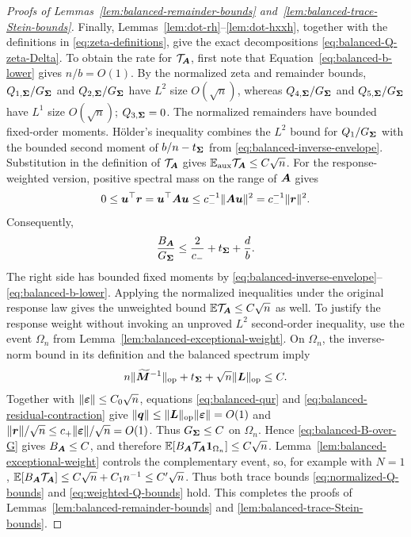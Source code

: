 \documentclass{article}
\theoremstyle{plain} %
\theoremstyle{definition} %
\theoremstyle{definition} %
\begin{document}
\begin{proof}[Proofs of Lemmas~\ref{lem:balanced-remainder-bounds}
and~\ref{lem:balanced-trace-Stein-bounds}]
Finally, Lemmas~\ref{lem:dot-rh}--\ref{lem:dot-hxxh}, together with
the definitions in \eqref{eq:zeta-definitions}, give
the exact decompositions \eqref{eq:balanced-Q-zeta-Delta}.
To obtain the rate for $\mathcal T_{\boldsymbol{A}}$, first note that
Equation~\eqref{eq:balanced-b-lower} gives $n/b=O(1)$.
By the normalized zeta and remainder bounds,
$Q_{1,\boldsymbol{\Sigma}}/G_{\boldsymbol{\Sigma}}$ and
$Q_{2,\boldsymbol{\Sigma}}/G_{\boldsymbol{\Sigma}}$ have $L^2$ size $O(\sqrt n)$,
whereas $Q_{4,\boldsymbol{\Sigma}}/G_{\boldsymbol{\Sigma}}$ and
$Q_{5,\boldsymbol{\Sigma}}/G_{\boldsymbol{\Sigma}}$ have $L^1$ size $O(\sqrt n)$;
$Q_{3,\boldsymbol{\Sigma}}=0$.  The normalized remainders have bounded
fixed-order moments. H\"older's inequality combines the $L^2$
bound for $Q_1/G_{\boldsymbol{\Sigma}}$ with the bounded second moment of
$b/n-t_{\boldsymbol{\Sigma}}$ from \eqref{eq:balanced-inverse-envelope}.
Substitution in the definition of $\mathcal T_{\boldsymbol{A}}$ gives
${\mathbb{E}}_{\rm aux}\mathcal T_{\boldsymbol{A}}\leq C\sqrt n$.
For the response-weighted version, positive spectral mass on the range of
$\boldsymbol{A}$ gives
\begin{align*}
    0\leq\boldsymbol{u}^\top\boldsymbol{r}=\boldsymbol{u}^\top\boldsymbol{A}\boldsymbol{u}
    \leq c_-^{-1}\lVert\boldsymbol{A}\boldsymbol{u}\rVert^2
    =c_-^{-1}\lVert\boldsymbol{r}\rVert^2.
\end{align*}
Consequently,
\begin{align}
    \frac{B_{\boldsymbol{A}}}{G_{\boldsymbol{\Sigma}}}
    \leq \frac{2}{c_-}+t_{\boldsymbol{\Sigma}}+\frac{d}{b}.
    \label{eq:balanced-B-over-G}
\end{align}
The right side has bounded fixed moments by
\eqref{eq:balanced-inverse-envelope}--\eqref{eq:balanced-b-lower}.  Applying
the normalized inequalities under the original response law gives the
unweighted bound ${\mathbb{E}}\mathcal T_{\boldsymbol{A}}\leq C\sqrt n$ as well.  To justify the
response weight without invoking an unproved $L^2$ second-order inequality,
use the event $\Omega_n$ from
Lemma~\ref{lem:balanced-exceptional-weight}.  On $\Omega_n$, the inverse-norm bound in its definition and the
balanced spectrum imply
\begin{align*}
    n\lVert\widetilde{\boldsymbol{M}}^{-1}\rVert_{\rm op}
       +t_{\boldsymbol{\Sigma}}+\sqrt n\lVert\boldsymbol{L}\rVert_{\rm op}\leq C.
\end{align*}
Together with $\lVert{\boldsymbol{\varepsilon} }\rVert\leq C_0\sqrt n$, equations
\eqref{eq:balanced-qur} and \eqref{eq:balanced-residual-contraction} give
$\lVert\boldsymbol{q}\rVert\leq\lVert\boldsymbol{L}\rVert_{\rm op}\lVert{\boldsymbol{\varepsilon} }\rVert=O(1)$ and
$\lVert\boldsymbol{r}\rVert/\sqrt n\leq c_+\lVert{\boldsymbol{\varepsilon} }\rVert/\sqrt n=O(1)$.
Thus $G_{\boldsymbol{\Sigma}}\leq C$ on $\Omega_n$.
Hence \eqref{eq:balanced-B-over-G} gives
$B_{\boldsymbol{A}}\leq C$, and therefore
${\mathbb{E}}[B_{\boldsymbol{A}}\mathcal T_{\boldsymbol{A}}\boldsymbol{1}_{\Omega_n}]\leq C\sqrt n$.
Lemma~\ref{lem:balanced-exceptional-weight} controls the complementary event,
so, for example with $N=1$,
${\mathbb{E}}[B_{\boldsymbol{A}}\mathcal T_{\boldsymbol{A}}]
\leq C\sqrt n+C_1n^{-1}\leq C'\sqrt n$.
Thus both trace bounds \eqref{eq:normalized-Q-bounds} and
\eqref{eq:weighted-Q-bounds} hold.
This completes the proofs of Lemmas~\ref{lem:balanced-remainder-bounds} and
\ref{lem:balanced-trace-Stein-bounds}.
\end{proof}
\end{document}
